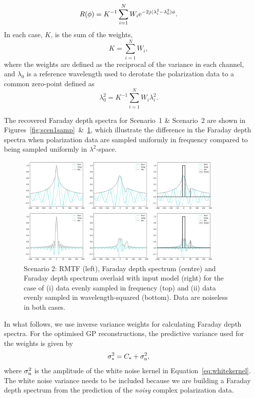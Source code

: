 \documentclass[fleqn,usenatbib]{mnras}
\begin{document}
%
\begin{equation}
R(\phi) = K^{-1}\sum_{i = 1}^{N}{W_i {\rm e}^{-2j (\lambda_i^2 - \lambda_0^2) \phi}}.
\end{equation}
%
In each case, $K$, is the sum of the weights,
%
\begin{equation}
K = \sum_{i = 1}^{N}{W_i},
\end{equation}
%
where the weights are defined as the reciprocal of the variance in each channel, and $\lambda_0$ is a reference wavelength used to derotate the polarization data to a common zero-point defined as
%
\begin{equation}
\lambda_0^2 = K^{-1}\sum_{i = 1}^{N}{W_i \lambda_i^2}.
\end{equation}

The recovered Faraday depth spectra for Scenario~1 \& Scenario~2 are shown in Figures~\ref{fig:scen1samp}~\&~\ref{fig:scen2samp}, which illustrate the difference in the Faraday depth spectra when polarization data are sampled uniformly in frequency compared to being sampled uniformly in $\lambda^2$-space.
%
\begin{figure}
\centerline{\includegraphics[width=0.9\textwidth]{./FIGURES/Scenario2_fsamp.png}}
\centerline{\includegraphics[width=0.9\textwidth]{./FIGURES/Scenario2_lsamp.png}}
\caption{\label{fig:scen2samp} Scenario 2: RMTF (left), Faraday depth spectrum (centre) and Faraday depth spectrum overlaid with input model (right) for the case of (i) data evenly sampled in frequency (top) and (ii) data evenly sampled in wavelength-squared (bottom). Data are noiseless in both cases.}
\end{figure}

In what follows, we use inverse variance weights for calculating Faraday depth spectra. For the optimised GP reconstructions, the predictive variance used for the weights is given by
%
\begin{equation}
\label{eq:gpvar}
\sigma_{\ast}^2 = C_{\ast} + \sigma_{\rm n}^2,
\end{equation}
%
\citep{3569} where $\sigma_{\rm n}^2$ is the amplitude of the white noise kernel in Equation~\ref{eq:whitekernel}. The white noise variance needs to be included because we are building a Faraday depth spectrum from the prediction of the {\it noisy} complex polarization data.
\end{document}
